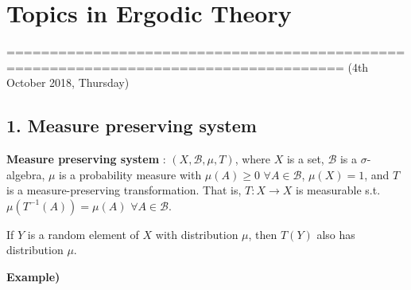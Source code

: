 \documentclass[10pt,a4paper]{report}
\begin{document}
\newcommand{\thm}{\textbf{Theorem) }}
\newcommand{\thmnum}[1]{\textbf{Theorem #1) }}
\newcommand{\defi}{\textbf{Definition) }}
\newcommand{\lem}{\textbf{Lemma) }}
\newcommand{\lemnum}[1]{\textbf{Lemma #1) }}
\newcommand{\prop}{\textbf{Proposition) }}
\newcommand{\pf}{\textbf{proof) }}
\newcommand{\cor}{\textbf{Corollary) }}
\newcommand{\cornum}[1]{\textbf{Corollary #1) }}

\newcommand{\lap}{\triangle} %
\newcommand{\s}{\vspace{10pt}}
\newcommand{\bull}{$\bullet$}
\newcommand{\sta}{$\star$}
\newcommand{\reals}{\mathbb{R}}

\newcommand{\eop}{\hfill  \textsl{(End of proof)} $\square$} %

\newcommand{\intN}{\mathbb{Z}_N}
\newcommand{\norms}[2]{\parallel #1 \parallel_{#2}}
\newcommand{\abs}[1]{\big| #1 \big|}
\newcommand{\avg}{\mathbb{E}}
\newcommand{\borel}{\mathscr{B}}
\newcommand{\setlimsup}[2]{\bigcap_{#1=1}^{\infty}\bigcup_{#2=#1}^{\infty}}
\newcommand{\dlim}{D-\lim}
\newcommand{\clim}{C-\lim}

\newcommand{\newday}{======================================================================}

\setlength\parindent{0pt}
\noindent

\chapter*{Topics in Ergodic Theory}
\s

=====================================================================================
(4th October 2018, Thursday)
\s

\section*{1. Measure preserving system}

\textbf{Measure preserving system} : $(X, \borel, \mu, T)$, where $X$ is a set, $\borel$ is a $\sigma$-algebra, $\mu$ is a probability measure with $\mu(A) \geq 0$ $\forall A \in \borel$, $\mu(X)=1$, and $T$ is a measure-preserving transformation. That is, $T: X\rightarrow X$ is measurable s.t. $\mu(T^{-1}(A)) = \mu(A)$ $\forall A \in \borel$.
\s

If $Y$ is a random element of $X$ with distribution $\mu$, then $T(Y)$ also has distribution $\mu$.
\s

\textbf{Example)}
\end{document}
